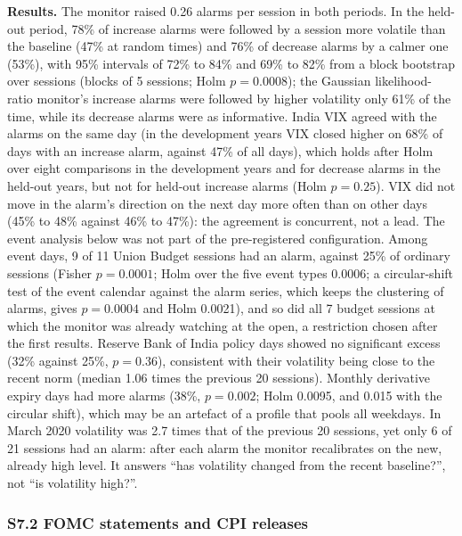 \documentclass[
]{article}
\begin{document}
\textbf{Results.} The monitor raised 0.26 alarms per session in both
periods. In the held-out period, 78\% of increase alarms were followed
by a session more volatile than the baseline (47\% at random times) and
76\% of decrease alarms by a calmer one (53\%), with 95\% intervals of
72\% to 84\% and 69\% to 82\% from a block bootstrap over sessions
(blocks of 5 sessions; Holm \(p = 0.0008\)); the Gaussian
likelihood-ratio monitor's increase alarms were followed by higher
volatility only 61\% of the time, while its decrease alarms were as
informative. India VIX agreed with the alarms on the same day (in the
development years VIX closed higher on 68\% of days with an increase
alarm, against 47\% of all days), which holds after Holm over eight
comparisons in the development years and for decrease alarms in the
held-out years, but not for held-out increase alarms (Holm
\(p = 0.25\)). VIX did not move in the alarm's direction on the next day
more often than on other days (45\% to 48\% against 46\% to 47\%): the
agreement is concurrent, not a lead. The event analysis below was not
part of the pre-registered configuration. Among event days, 9 of 11
Union Budget sessions had an alarm, against 25\% of ordinary sessions
(Fisher \(p = 0.0001\); Holm over the five event types 0.0006; a
circular-shift test of the event calendar against the alarm series,
which keeps the clustering of alarms, gives \(p = 0.0004\) and Holm
0.0021), and so did all 7 budget sessions at which the monitor was
already watching at the open, a restriction chosen after the first
results. Reserve Bank of India policy days showed no significant excess
(32\% against 25\%, \(p = 0.36\)), consistent with their volatility
being close to the recent norm (median 1.06 times the previous 20
sessions). Monthly derivative expiry days had more alarms (38\%,
\(p = 0.002\); Holm 0.0095, and 0.015 with the circular shift), which
may be an artefact of a profile that pools all weekdays. In March 2020
volatility was 2.7 times that of the previous 20 sessions, yet only 6 of
21 sessions had an alarm: after each alarm the monitor recalibrates on
the new, already high level. It answers ``has volatility changed from
the recent baseline?'', not ``is volatility high?''.

\hypertarget{s7.2-fomc-statements-and-cpi-releases}{%
\subsubsection{S7.2 FOMC statements and CPI
releases}\label{s7.2-fomc-statements-and-cpi-releases}}
\end{document}
